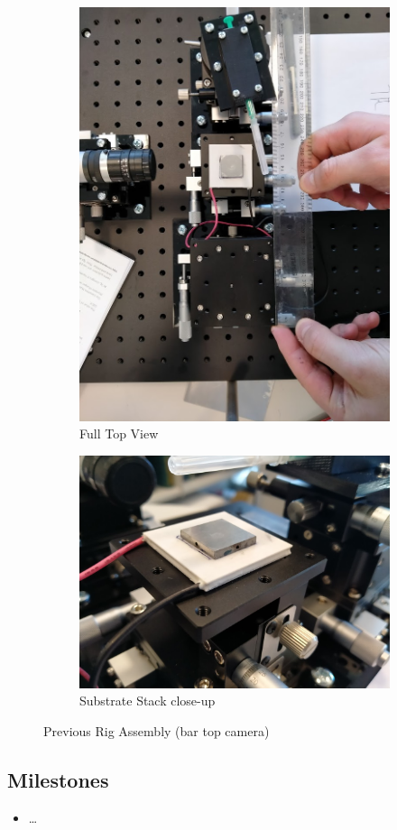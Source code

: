 \documentclass[11pt, a4paper, twoside, openright]{report}
\begin{document}
\begin{figure}
  \begin{subfigure}{.5\textwidth}
    \centering
    \includegraphics[height=.75\linewidth]{Figures/Full_rig_top.jpg}
    \caption{Full Top View}
  \end{subfigure}%
  \begin{subfigure}{.5\textwidth}
    \centering
    \includegraphics[height=.75\linewidth]{Figures/substrate_stack.jpg}
    \caption{Substrate Stack close-up}
  \end{subfigure}
  \caption{Previous Rig Assembly (bar top camera)}
  \label{fig::old_rig}
  \end{figure}

\subsection{Milestones}
\begin{itemize}
  \item \dots
\end{itemize}
\end{document}
